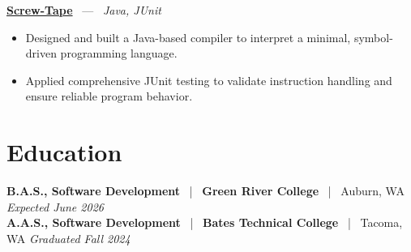 \documentclass[10pt, letterpaper]{article}
\newcommand{\jobhead}[4]{%
  \vspace{5pt}%
  {\bfseries\color{dark}#1}%
  ~{\color{light}|}~%
  {\bfseries\color{navy}#2}%
  ~{\color{light}|}~%
  {\color{light}#3}%
  \hfill{\color{light}\small\textit{#4}}\\[-2pt]%
}
\newcommand{\projhead}[3]{%
  \vspace{5pt}%
  {\bfseries\color{dark}\href{#2}{#1}}%
  ~{\color{light}---}~%
  {\color{light}\small\textit{#3}}\\[-2pt]%
}
\begin{document}
\projhead{Screw-Tape}{https://github.com/timmyd4/screwtape}{Java, JUnit}
\begin{itemize}
  \item Designed and built a Java-based compiler to interpret a minimal, symbol-driven programming language.
  \item Applied comprehensive JUnit testing to validate instruction handling and ensure reliable program behavior.
\end{itemize}

\section{Education}

\jobhead{B.A.S., Software Development}{Green River College}{Auburn, WA}{Expected June 2026}
\jobhead{A.A.S., Software Development}{Bates Technical College}{Tacoma, WA}{Graduated Fall 2024}
\end{document}
